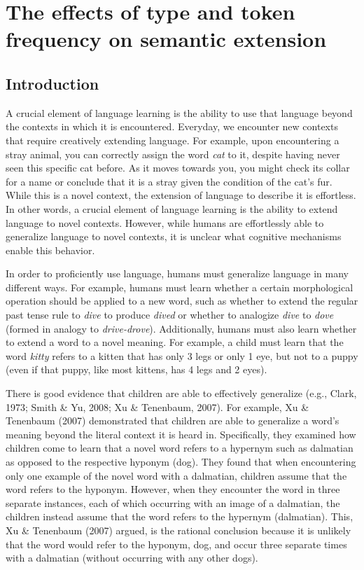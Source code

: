 \documentclass[
  letterpaper,
  DIV=11,
  numbers=noendperiod]{scrartcl}
\author{}
\date{}
\begin{document}
\section{The effects of type and token frequency on semantic
extension}\label{the-effects-of-type-and-token-frequency-on-semantic-extension}

\doublespacing

\setlength{\parindent}{4em}

\subsection{Introduction}\label{introduction}

A crucial element of language learning is the ability to use that
language beyond the contexts in which it is encountered. Everyday, we
encounter new contexts that require creatively extending language. For
example, upon encountering a stray animal, you can correctly assign the
word \emph{cat} to it, despite having never seen this specific cat
before. As it moves towards you, you might check its collar for a name
or conclude that it is a stray given the condition of the cat's fur.
While this is a novel context, the extension of language to describe it
is effortless. In other words, a crucial element of language learning is
the ability to extend language to novel contexts. However, while humans
are effortlessly able to generalize language to novel contexts, it is
unclear what cognitive mechanisms enable this behavior.

In order to proficiently use language, humans must generalize language
in many different ways. For example, humans must learn whether a certain
morphological operation should be applied to a new word, such as whether
to extend the regular past tense rule to \emph{dive} to produce
\emph{dived} or whether to analogize \emph{dive} to \emph{dove} (formed
in analogy to \emph{drive-drove}). Additionally, humans must also learn
whether to extend a word to a novel meaning. For example, a child must
learn that the word \emph{kitty} refers to a kitten that has only 3 legs
or only 1 eye, but not to a puppy (even if that puppy, like most
kittens, has 4 legs and 2 eyes).

There is good evidence that children are able to effectively generalize
(e.g., Clark, 1973; Smith \& Yu, 2008; Xu \& Tenenbaum, 2007). For
example, Xu \& Tenenbaum (2007) demonstrated that children are able to
generalize a word's meaning beyond the literal context it is heard in.
Specifically, they examined how children come to learn that a novel word
refers to a hypernym such as dalmatian as opposed to the respective
hyponym (dog). They found that when encountering only one example of the
novel word with a dalmatian, children assume that the word refers to the
hyponym. However, when they encounter the word in three separate
instances, each of which occurring with an image of a dalmatian, the
children instead assume that the word refers to the hypernym
(dalmatian). This, Xu \& Tenenbaum (2007) argued, is the rational
conclusion because it is unlikely that the word would refer to the
hyponym, dog, and occur three separate times with a dalmatian (without
occurring with any other dogs).
\end{document}
